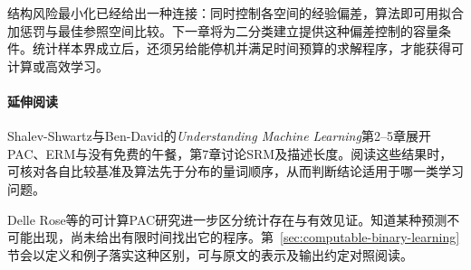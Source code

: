 结构风险最小化已经给出一种连接：同时控制各空间的经验偏差，算法即可用拟合加惩罚与最佳参照空间比较。下一章将为二分类建立提供这种偏差控制的容量条件。统计样本界成立后，还须另给能停机并满足时间预算的求解程序，才能获得可计算或高效学习。

\paragraph{延伸阅读}
Shalev-Shwartz与Ben-David的\textit{Understanding Machine Learning}第2--5章展开PAC、ERM与没有免费的午餐，第7章讨论SRM及描述长度。阅读这些结果时，可核对各自比较基准及算法先于分布的量词顺序，从而判断结论适用于哪一类学习问题。

Delle Rose等的可计算PAC研究进一步区分统计存在与有效见证。知道某种预测不可能出现，尚未给出有限时间找出它的程序。第~\ref{sec:computable-binary-learning}节会以定义和例子落实这种区别，可与原文的表示及输出约定对照阅读。
